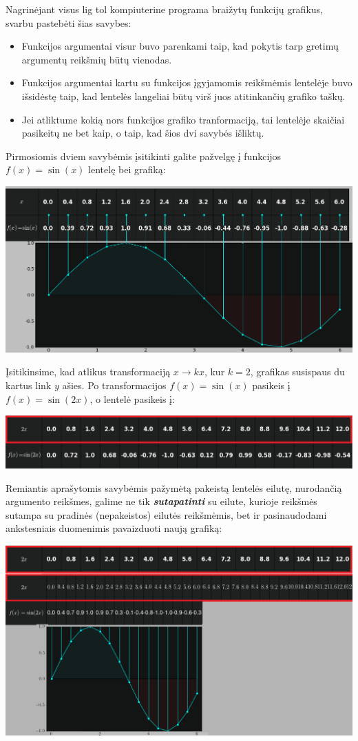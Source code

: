 \documentclass{article}
\begin{document}
Nagrinėjant visus lig tol kompiuterine programa braižytų funkcijų grafikus, svarbu pastebėti šias savybes:
\begin{itemize}
\item Funkcijos argumentai visur buvo parenkami taip, kad pokytis tarp gretimų argumentų reikšmių būtų vienodas.
\item Funkcijos argumentai kartu su funkcijos įgyjamomis reikšmėmis lentelėje buvo išsidėstę taip, kad lentelės langeliai būtų virš juos atitinkančių grafiko taškų.
\item Jei atliktume kokią nors funkcijos grafiko tranformaciją, tai lentelėje skaičiai pasikeitų ne bet kaip, o taip, kad šios dvi savybės išliktų.
\end{itemize}

Pirmosiomis dviem savybėmis įsitikinti galite pažvelgę į funkcijos $f(x)=\sin(x)$ lentelę bei grafiką:

\includegraphics[width=\textwidth]{graphtrans_1.png}

Įsitikinsime, kad atlikus transformaciją $x \to kx$, kur $k=2$, grafikas susispaus du kartus link $y$ ašies. Po transformacijos $f(x)=\sin(x)$ pasikeis į $f(x)=\sin(2x)$, o lentelė pasikeis į:

\includegraphics[width=\textwidth]{graphtrans_2.png}

Remiantis aprašytomis savybėmis pažymėtą pakeistą lentelės eilutę, nurodančią argumento reikšmes, galime ne tik \textbf{\textit{sutapatinti}} su eilute, kurioje reikšmės sutampa su pradinės (nepakeistos) eilutės reikšmėmis, bet ir pasinaudodami ankstesniais duomenimis pavaizduoti naują grafiką:

\includegraphics[width=\textwidth]{graphtrans_3.png}
\end{document}
